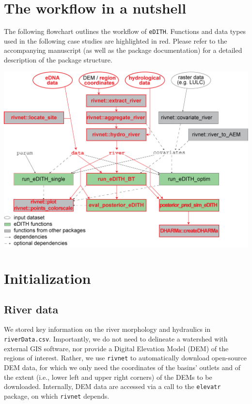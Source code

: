 \documentclass[
]{article}
\begin{document}
\hypertarget{the-workflow-in-a-nutshell}{%
\section{The workflow in a nutshell}\label{the-workflow-in-a-nutshell}}

The following flowchart outlines the workflow of \texttt{eDITH}. Functions and data types used in the following case studies are highlighted in red. Please refer to the accompanying manuscript (as well as the package documentation) for a detailed description of the package structure.

\includegraphics[width=0.9\linewidth]{../data/eDITH_scheme}

\hypertarget{initialization}{%
\section{Initialization}\label{initialization}}

\hypertarget{river-data}{%
\subsection{River data}\label{river-data}}

We stored key information on the river morphology and hydraulics in \texttt{riverData.csv}. Importantly, we do not need to delineate a watershed with external GIS software, nor provide a Digital Elevation Model (DEM) of the regions of interest. Rather, we use \texttt{rivnet} to automatically download open-source DEM data, for which we only need the coordinates of the basins' outlets and of the extent (i.e., lower left and upper right corners) of the DEMs to be downloaded. Internally, DEM data are accessed via a call to the \texttt{elevatr} package, on which \texttt{rivnet} depends.
\end{document}
